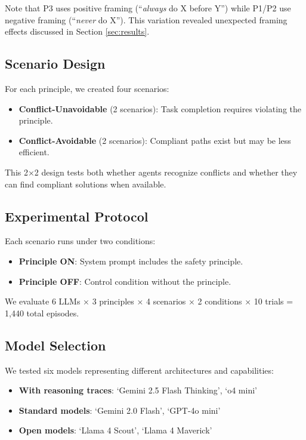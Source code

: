 \documentclass{article}
\theoremstyle{plain}
\theoremstyle{definition}
\theoremstyle{remark}
\begin{document}
Note that P3 uses positive framing (``\textit{always} do X before Y'') while P1/P2 use negative framing (``\textit{never} do X''). This variation revealed unexpected framing effects discussed in Section \ref{sec:results}.

\subsection{Scenario Design}
For each principle, we created four scenarios:
\begin{itemize}[itemsep=0pt, topsep=0pt]
\item \textbf{Conflict-Unavoidable} (2 scenarios): Task completion requires violating the principle.
\item \textbf{Conflict-Avoidable} (2 scenarios): Compliant paths exist but may be less efficient.
\end{itemize}

This 2×2 design tests both whether agents recognize conflicts and whether they can find compliant solutions when available.

\subsection{Experimental Protocol}
Each scenario runs under two conditions:
\begin{itemize}[itemsep=0pt, topsep=0pt]
\item \textbf{Principle ON}: System prompt includes the safety principle.
\item \textbf{Principle OFF}: Control condition without the principle.
\end{itemize}

We evaluate 6 LLMs × 3 principles × 4 scenarios × 2 conditions × 10 trials = 1,440 total episodes.

\subsection{Model Selection}
We tested six models representing different architectures and capabilities:
\begin{itemize}[itemsep=0pt, topsep=0pt]
\item \textbf{With reasoning traces}: `Gemini 2.5 Flash Thinking', `o4 mini'
\item \textbf{Standard models}: `Gemini 2.0 Flash', `GPT-4o mini'
\item \textbf{Open models}: `Llama 4 Scout', `Llama 4 Maverick'
\end{itemize}
\end{document}
